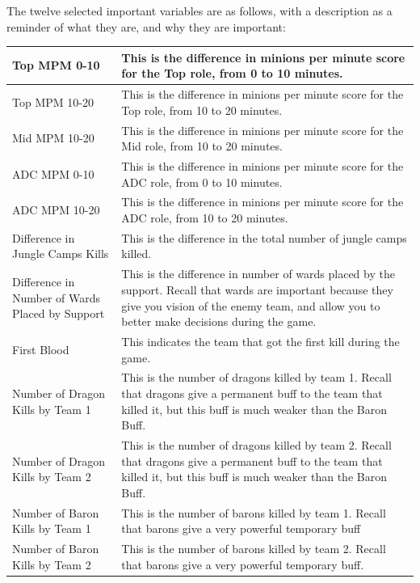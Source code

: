 \documentclass[runningheads]{llncs}
\begin{document}
	The twelve selected important variables are as follows, with a description as a reminder of what they are, and why they are important:
	
	\begin{center}
		\begin{tabular}{ | l | L{7cm} | }
			\hline
			Top MPM 0-10 & This is the difference in  minions per minute score for the Top role, from 0 to 10 minutes. \\ \hline
			Top MPM 10-20 & This is the difference in minions per minute score for the Top role, from 10 to 20 minutes. \\ \hline
			Mid MPM 10-20 & This is the difference in minions per minute score for the Mid role, from 10 to 20 minutes. \\ \hline
			ADC MPM 0-10 & This is the difference in minions per minute score for the ADC role, from 0 to 10 minutes. \\ \hline
			ADC MPM 10-20 & This is the difference in minions per minute score for the ADC role, from 10 to 20 minutes. \\ \hline
			Difference in Jungle Camps Kills & This is the difference in the total number of jungle camps killed. \\ \hline
			Difference in Number of Wards Placed by Support & This is the difference in number of wards placed by the support. Recall that wards are important because they give you vision of the enemy team, and allow you to better make decisions during the game. \\ \hline
			First Blood & This indicates the team that got the first kill during the game. \\ \hline
			Number of Dragon Kills by Team 1 & This is the number of dragons killed by team 1. Recall that dragons give a permanent buff to the team that killed it, but this buff is much weaker than the Baron Buff. \\ \hline
			Number of Dragon Kills by Team 2 & This is the number of dragons killed by team 2. Recall that dragons give a permanent buff to the team that killed it, but this buff is much weaker than the Baron Buff. \\ \hline
			Number of Baron Kills by Team 1 & This is the number of barons killed by team 1. Recall that barons give a very powerful temporary buff \\ \hline
			Number of Baron Kills by Team 2 & This is the number of barons killed by team 2. Recall that barons give a very powerful temporary buff. \\ \hline
		\end{tabular}
	\end{center}	
	
\end{document}
